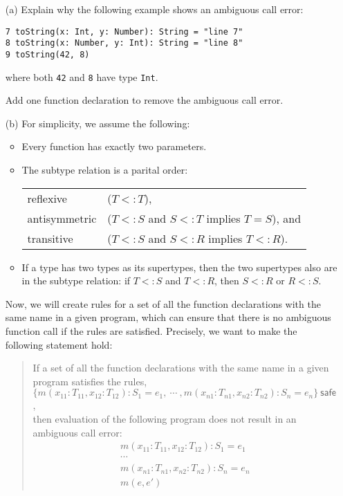 \begin{enumerate}
\begin{itemize}
\item[(a)] Explain why the following example shows an ambiguous call error:
\begin{verbatim}
7 toString(x: Int, y: Number): String = "line 7"
8 toString(x: Number, y: Int): String = "line 8"
9 toString(42, 8)
\end{verbatim}
where both \verb!42! and \verb!8! have type \verb!Int!.

Add one function declaration to remove the ambiguous call error.

\item[(b)] For simplicity, we assume the following:
\begin{itemize}
\item Every function has exactly two parameters.
\item The subtype relation is a parital order:

\begin{tabular}{ll}
reflexive &($T<:T$),\\
antisymmetric &($T<:S$ and $S<:T$ implies $T=S$), and\\
transitive &($T<:S$ and $S<:R$ implies $T<:R$).
\end{tabular}
\item If a type has two types as its supertypes, then the two supertypes also are in the subtype relation: if $T<:S$ and $T<:R$, then $S<:R$ or $R<:S$.
\end{itemize}

Now, we will create rules for a set of all the function declarations with the same name in a given program,
which can ensure that there is no ambiguous function call if the rules are satisfied.
Precisely, we want to make the following statement hold:
\begin{quote}
If a set of all the function declarations with the same name in a given program satisfies the rules,
$\{m(x_{11}:T_{11},x_{12}:T_{12}): S_1=e_1,\ \cdots\ ,m(x_{n1}:T_{n1},x_{n2}:T_{n2}): S_n=e_n\}~\textsf{safe}$,\\
then evaluation of the following program does not result in an ambiguous call error:
\[
\begin{array}{l}
m(x_{11}:T_{11},x_{12}:T_{12}): S_1=e_1 \\
\cdots \\
m(x_{n1}:T_{n1},x_{n2}:T_{n2}): S_n=e_n \\
m(e, e')
\end{array}
\]
\end{quote}


\end{itemize}
\end{enumerate}

